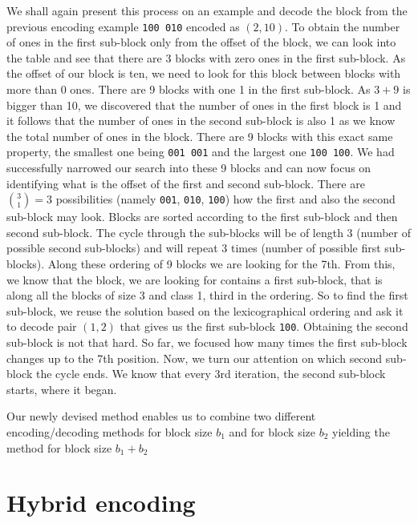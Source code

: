 We shall again present this process on an example and decode the block from the previous
encoding example {\tt 100 010} encoded as $(2, 10)$. To obtain the number of ones in
the first sub-block only from the offset of the block, we can look into the table and
see that there are 3 blocks with zero ones in the first sub-block. As the offset of our
block is ten, we need to look for this block between blocks with more than 0 ones. There
are 9 blocks with one 1 in the first sub-block. As $3+9$ is bigger than 10, we discovered
that the number of ones in the first block is 1 and it follows that the number of ones in
the second sub-block is
also 1 as we know the total number of ones in the block. There are 9 blocks with
this exact same property, the smallest one being {\tt 001 001} and the largest one
{\tt 100 100}. We had successfully narrowed our search into these 9 blocks and can now
focus on identifying what is the offset of the first and second sub-block. There are
${3 \choose 1} = 3$ possibilities (namely {\tt 001}, {\tt 010}, {\tt 100}) how the first
and also the second sub-block may look. Blocks are sorted according
to the first sub-block and then second sub-block. The cycle through
the sub-blocks will be of length 3 (number of possible second sub-blocks) and will repeat
3 times (number of possible first sub-blocks). Along these ordering of 9 blocks we are
looking for the 7th. From this, we know that the block, we are looking for contains a
first sub-block, that is along all the blocks of size 3 and class 1, third in the ordering.
So to find the first sub-block, we reuse the solution based on the lexicographical ordering
and ask it to decode pair $(1, 2)$ that gives us the first sub-block {\tt 100}. Obtaining
the second sub-block is not that hard. So far, we focused how many times the first sub-block
changes up to the 7th position. Now, we turn our attention on which second sub-block the cycle
ends. We know that every 3rd iteration, the second sub-block starts, where it began.

Our newly devised method enables us to combine two different encoding/decoding methods
for block size $b_1$ and for block size $b_2$ yielding the method for block size $b_1+b_2$

\section{Hybrid encoding}


